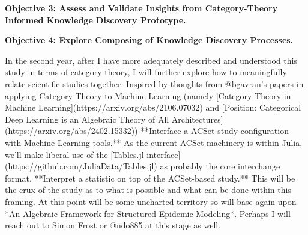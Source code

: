 \documentclass[11pt]{extarticle}
\begin{document}
\textbf{Objective 3: Assess and Validate Insights from Category-Theory Informed Knowledge Discovery Prototype.}

\textbf{Objective 4: Explore Composing of Knowledge Discovery Processes.}

In the second year, after I have more adequately described and understood this study in terms of category theory, I will further explore how to meaningfully relate scientific studies together.
Inspired by thoughts from @bgavran's papers in applying Category Theory to Machine Learning (namely [Category Theory in Machine Learning](https://arxiv.org/abs/2106.07032) and [Position: Categorical Deep Learning is an Algebraic Theory of All Architectures](https://arxiv.org/abs/2402.15332)) 
**Interface a ACSet study configuration with Machine Learning tools.** As the current ACSet machinery is within Julia, we'll make liberal use of the [Tables.jl interface](https://github.com/JuliaData/Tables.jl) as probably the core interchange format.
**Interpret a statistic on top of the ACSet-based study.** This will be the crux of the study as to what is possible and what can be done within this framing. At this point will be some uncharted territory so will base again upon *An Algebraic Framework for Structured Epidemic Modeling*. Perhaps I will reach out to Simon Frost or @ndo885 at this stage as well.
\end{document}
